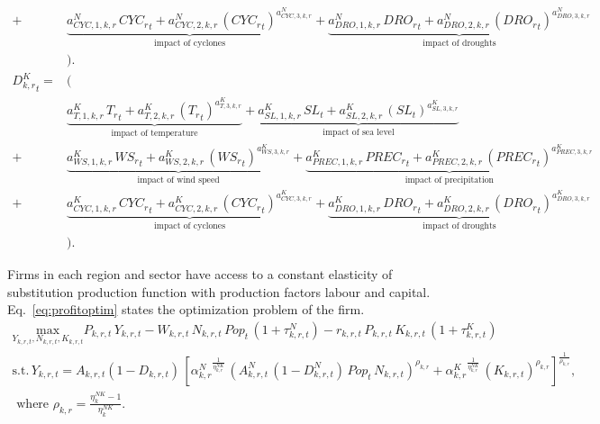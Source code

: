 \documentclass[10pt,a4paper]{article}
\begin{document}
\begin{align}
+ & \underbrace{{{a^{N}_{CYC,1,k,r}}}\, {{CYC_{r}}_{t}}+{{a^{N}_{CYC,2,k,r}}}\, \left({CYC_{r}}_{t}\right)^{{{a^{N}_{CYC,3,k,r}}}}}_{\mbox{impact of cyclones}}
+ \underbrace{{{a^{N}_{DRO,1,k,r}}} \, {{DRO_{r}}_{t}}+{{a^{N}_{DRO,2,k,r}}}\, \left({DRO_{r}}_{t}\right)^{{{a^{N}_{DRO,3,k,r}}}}}_{\mbox{impact of droughts}} \nonumber \\
&\Big). \label{eq:DamagesLabour} \\
{{D^{K}_{k,r}}_{t}}=& \Big( \nonumber \\
&\underbrace{{{a^{K}_{T,1,k,r}}} \, {{T_{r}}_{t}}+{{a^{K}_{T,2,k,r}}}\, \left({T_{r}}_{t}\right)^{a^{K}_{T,3,k,r}}}_{\mbox{impact of temperature}}+ \underbrace{{{a^{K}_{SL,1,k,r}}}\, {{SL}_{t}}+{{a^{K}_{SL,2,k,r}}}\, \left({SL}_{t}\right)^{{{a^{K}_{SL,3,k,r}}}}}_{\mbox{impact of sea level}} \nonumber \\
+ & \underbrace{{{a^{K}_{WS,1,k,r}}}\, {{WS_{r}}_{t}}+{{a^{K}_{WS,2,k,r}}}\, \left({WS_{r}}_{t}\right)^{{{a^{K}_{WS,3,k,r}}}}}_{\mbox{impact of wind speed}}
+ \underbrace{{{a^{K}_{PREC,1,k,r}}} \, {{PREC_{r}}_{t}}+{{a^{K}_{PREC,2,k,r}}}\, \left({PREC_{r}}_{t}\right)^{{{a^{K}_{PREC,3,k,r}}}}}_{\mbox{impact of precipitation}} \nonumber \\
+ & \underbrace{{{a^{K}_{CYC,1,k,r}}}\, {{CYC_{r}}_{t}}+{{a^{K}_{CYC,2,k,r}}}\, \left({CYC_{r}}_{t}\right)^{{{a^{K}_{CYC,3,k,r}}}}}_{\mbox{impact of cyclones}}
+ \underbrace{{{a^{K}_{DRO,1,k,r}}} \, {{DRO_{r}}_{t}}+{{a^{K}_{DRO,2,k,r}}}\, \left({DRO_{r}}_{t}\right)^{{{a^{K}_{DRO,3,k,r}}}}}_{\mbox{impact of droughts}} \nonumber \\
&\Big). \label{eq:DamagesCapital}
\end{align}

Firms in each region and sector have access to a constant elasticity of substitution production function with production factors labour and capital. Eq.~\ref{eq:profitoptim} states the optimization problem of the firm.
\begin{align}\label{eq:profitoptim}
\underset{Y_{k,r,t}, N_{k,r,t}, K_{k,r,t}}{\mathrm{max}} P_{k,r,t} \, Y_{k,r,t} - W_{k,r,t} \, N_{k,r,t} \, Pop_{t} \, (1 + \tau^{N}_{k,r,t}) - r_{k,r,t} \, P_{k,r,t} \, K_{k,r,t} \, (1 + \tau^{K}_{k,r,t})\nonumber \\ 
\mbox{s.t.} \, Y_{k,r,t} = A_{k,r,t} (1 - D_{k,r,t}) \, \left[{\alpha^{N}_{k,r}}^{\frac{1}{\eta^{NK}_{k,r}}} \, \left( A^{N}_{k,r,t} \, (1 - D^{N}_{k,r,t}) \, Pop_{t} \, N_{k,r,t}\right)^{\rho_{k,r}} + {\alpha^{K}_{k,r}}^{\frac{1}{\eta^{NK}_{k,r}}} \, \left(K_{k,r,t}\right)^{\rho_{k,r}}\right]^{\frac{1}{\rho_{k,r}}}, \nonumber \\
\mbox{ where } \rho_{k,r} = \frac{\eta^{NK}_{k} - 1}{\eta^{NK}_{k}}.
\end{align}
\end{document}
